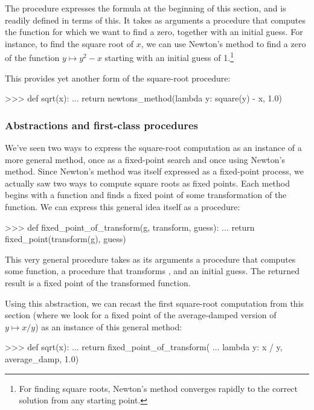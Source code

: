 \noindent
The  procedure expresses the formula at the beginning of
this section, and  is readily defined in terms of this.
It takes as arguments a procedure that computes the function for which we want
to find a zero, together with an initial guess.  For instance, to find the
square root of \( x \), we can use Newton's method to find a zero of the function
\( y \mapsto y^2 - x \) starting with an initial guess of 1.\footnote{For
finding square roots, Newton's method converges rapidly to the correct solution
from any starting point.}

This provides yet another form of the square-root procedure:

\begin{codeBlock}
>>> def sqrt(x):
...     return newtons_method(lambda y: square(y) - x, 1.0)
\end{codeBlock}

\subsubsection*{Abstractions and first-class procedures}

We've seen two ways to express the square-root computation as an instance of a
more general method, once as a fixed-point search and once using Newton's
method.  Since Newton's method was itself expressed as a fixed-point process,
we actually saw two ways to compute square roots as fixed points.  Each method
begins with a function and finds a fixed point of some transformation of the
function.  We can express this general idea itself as a procedure:

\begin{codeBlock}
>>> def fixed_point_of_transform(g, transform, guess):
...     return fixed_point(transform(g), guess)
\end{codeBlock}

\noindent
This very general procedure takes as its arguments a procedure  that
computes some function, a procedure that transforms , and an initial
guess.  The returned result is a fixed point of the transformed function.

Using this abstraction, we can recast the first square-root computation from
this section (where we look for a fixed point of the average-damped version of
\( y \mapsto x / y \)) as an instance of this general method:

\begin{codeBlock}
>>> def sqrt(x):
...     return fixed_point_of_transform(
...         lambda y: x / y, average_damp, 1.0)
\end{codeBlock}

